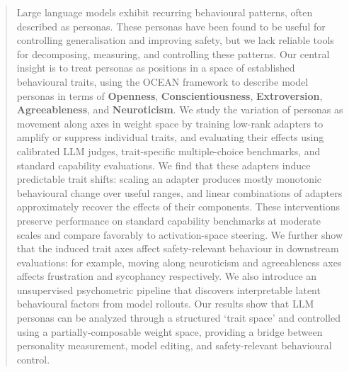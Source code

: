 \begin{abstract}
Large language models exhibit recurring behavioural patterns, often described as personas. These personas have been found to be useful for controlling generalisation and improving safety, but we lack reliable tools for decomposing, measuring, and controlling these patterns. Our central insight is to treat personas as positions in a space of established behavioural traits, using the OCEAN framework to describe model personas in terms of \textbf{Openness}, \textbf{Conscientiousness}, \textbf{Extroversion}, \textbf{Agreeableness}, and \textbf{Neuroticism}. We study the variation of personas as movement along axes in weight space by training low-rank adapters to amplify or suppress individual traits, and evaluating their effects using calibrated LLM judges, trait-specific multiple-choice benchmarks, and standard capability evaluations. We find that these adapters induce predictable trait shifts: scaling an adapter produces mostly monotonic behavioural change over useful ranges, and linear combinations of adapters approximately recover the effects of their components. These interventions preserve performance on standard capability benchmarks at moderate scales and compare favorably to activation-space steering. We further show that the induced trait axes affect safety-relevant behaviour in downstream evaluations: for example, moving along neuroticism and agreeableness axes affects frustration and sycophancy respectively. We also introduce an unsupervised psychometric pipeline that discovers interpretable latent behavioural factors from model rollouts. Our results show that LLM personas can be analyzed through a structured ‘trait space’ and controlled using a partially-composable weight space, providing a bridge between personality measurement, model editing, and safety-relevant behavioural control.
\end{abstract}
